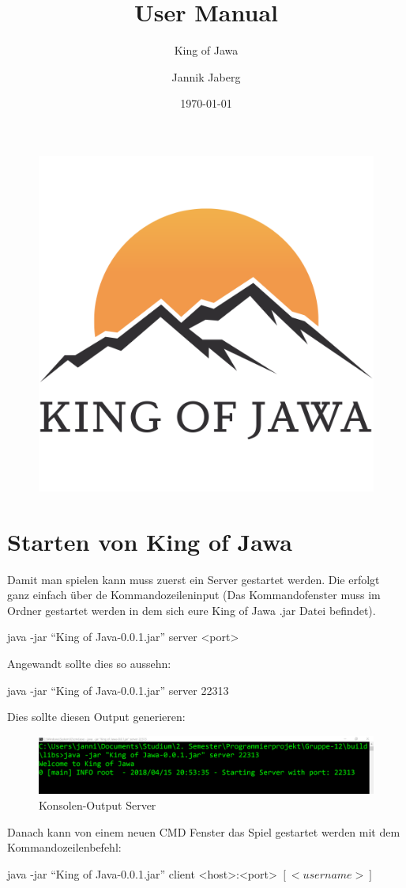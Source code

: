 \documentclass{scrartcl}
\title{User Manual}
\subtitle{King of Jawa}
\author{Jannik Jaberg}
\date{\today}
\newcommand{\n}{\newline}
\begin{document}
\maketitle
\begin{figure}[H]
	\includegraphics[width=\linewidth]{LOGO.png}
\end{figure}
\tableofcontents
\pagebreak
\section{Starten von King of Jawa}

Damit man spielen kann muss zuerst ein Server gestartet werden. Die erfolgt ganz einfach über de Kommandozeileninput (Das Kommandofenster muss im Ordner gestartet werden in dem sich eure King of Jawa .jar Datei befindet).
\begin{center}
    java -jar “King of Java-0.0.1.jar” server <port>
\end{center}
Angewandt sollte dies so aussehn:
\begin{center}
    java -jar “King of Java-0.0.1.jar” server 22313
\end{center}
Dies sollte diesen Output generieren:\n
\begin{figure}[H]
	\includegraphics[width=\linewidth]{CMDserver.png}
	\caption{Konsolen-Output Server}
	\label{fig:map1}
\end{figure}
Danach kann von einem neuen CMD Fenster das Spiel gestartet werden mit dem Kommandozeilenbefehl:
\begin{center}
    java -jar “King of Java-0.0.1.jar” client <host>:<port> $[<username>]$ 
\end{center}
\end{document}
